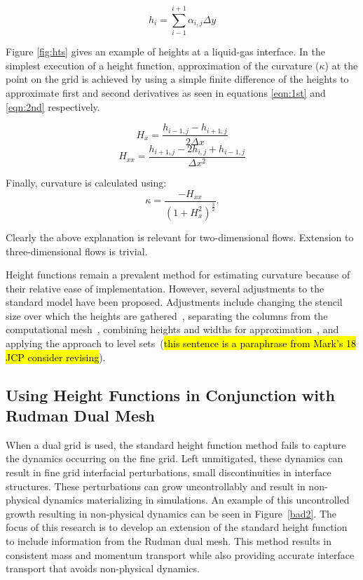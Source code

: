 \begin{equation}
h_{i} = \sum_{i-1}^{i+1} \alpha_{i,j} \Delta y
\label{eqn:hts}
\end{equation}

\noindent Figure \ref{fig:hts} gives an example of heights at a liquid-gas interface. In the simplest execution of a height function, approximation of the curvature ($\kappa$) at the point on the grid is achieved by using a simple finite difference of the heights to approximate first and second derivatives as seen in equations \ref{eqn:1st} and \ref{eqn:2nd} respectively. 

\begin{equation}
H_{x} = \frac{h_{i-1,j}-h_{i+1,j}}{2 \Delta x}
\label{eqn:1st}
\end{equation}
\begin{equation}
H_{xx} = \frac{h_{i+1,j}-2h_{i,j}+h_{i-1,j}}{ \Delta x^2}
\label{eqn:2nd}
\end{equation}

\noindent Finally, curvature is calculated using:
\begin{equation}
\kappa = \frac{-H_{xx}}{(1+H_{x}^{2})^{\frac{3}{2}}}.
\label{eqn:kap}
\end{equation}

\noindent Clearly the above explanation is relevant for two-dimensional flows. Extension to three-dimensional flows is trivial.

Height functions remain a prevalent method for estimating curvature because of their relative ease of implementation. However, several adjustments to the standard model have been proposed. Adjustments include changing the stencil size over which the heights are gathered~\cite{1}, separating the columns from the computational mesh~\cite{2}, combining heights and widths for approximation~\cite{2}, and applying the approach to level sets~\cite{2}(\hl{this sentence is a paraphrase from Mark's 18 JCP consider revising}).


\subsection{Using Height Functions in Conjunction with Rudman Dual Mesh }

When a dual grid is used, the standard height function method fails to capture the dynamics occurring on the fine grid. Left unmitigated, these dynamics can result in fine grid interfacial perturbations, small discontinuities in interface structures. These perturbations can grow uncontrollably and result in non-physical dynamics materializing in simulations. An example of this uncontrolled growth resulting in non-physical dynamics can be seen in Figure~\ref{bad2}. The focus of this research is to develop an extension of the standard height function to include information from the Rudman dual mesh. This method results in consistent mass and momentum transport while also providing accurate interface transport that avoids non-physical dynamics.


